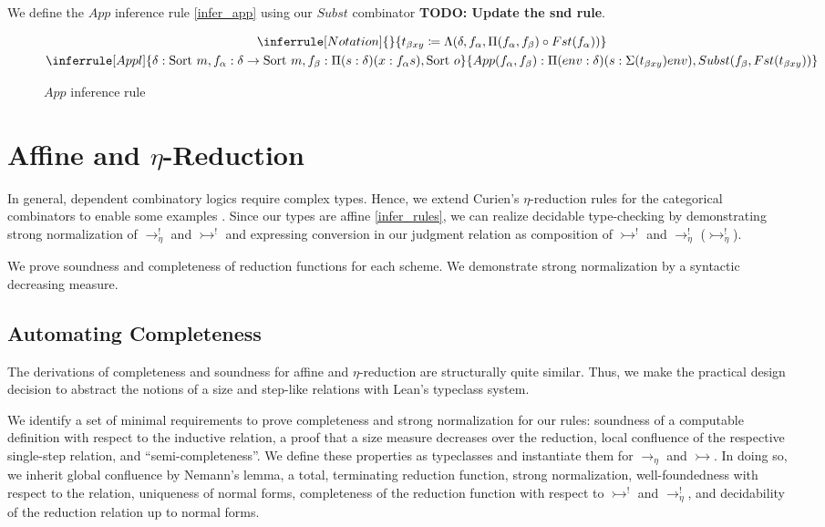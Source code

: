 \documentclass{article}
\newcommand{\sort}[1]{\text{Sort}\ #1}
\newcommand{\affarr}{\rightarrowtail}
\newcommand{\affetaarr}{\rightarrowtail_{\eta}}
\newcommand{\etaarr}{\rightarrow_{\eta}}
\begin{document}
We define the \(App\) inference rule \eqref{infer_app} using our \(Subst\) combinator \textbf{TODO: Update the snd rule}.

\begin{figure}[H]
  \centering
  \begin{equation}\label{infer_app}
    \begin{gathered}
    \inferrule [Notation]
    { }
    { t_{\beta x y} \coloneq \Lambda(\delta, f_\alpha, \Pi(f_\alpha, f_\beta) \circ Fst(f_\alpha)) }\\
    \inferrule [Appl]
    { \delta : \sort{m}, f_{\alpha} : \delta \rightarrow \sort{m}, f_{\beta} : \Pi(s : \delta) (x : f_\alpha s),\sort{o}}
    { App(f_\alpha, f_\beta) : \Pi(env : \delta) (s : \Sigma(t_{\beta x y}) env), Subst(f_\beta, Fst(t_{\beta x y}))}
    \end{gathered}
  \end{equation}
  \caption{\(App\) inference rule}
\end{figure}

\section{Affine and \(\eta\)-Reduction}

In general, dependent combinatory logics require complex types. Hence, we extend Curien's \(\eta\)-reduction rules for the categorical combinators to enable some examples \autocite[p. 221]{CURIEN1986188}. Since our types are affine \eqref{infer_rules}, we can realize decidable type-checking by demonstrating strong normalization of \(\etaarr^{!}\) and \(\affarr^{!}\) and expressing conversion in our judgment relation as composition of \(\affarr^{!}\) and \(\etaarr^{!}\) (\(\affetaarr^{!}\)).

We prove soundness and completeness of reduction functions for each scheme. We demonstrate strong normalization by a syntactic decreasing measure.

\subsection{Automating Completeness}\label{red_classes}

The derivations of completeness and soundness for affine and \(\eta\)-reduction are structurally quite similar. Thus, we make the practical design decision to abstract the notions of a size and step-like relations with Lean's typeclass system.

We identify a set of minimal requirements to prove completeness and strong normalization for our rules: soundness of a computable definition with respect to the inductive relation, a proof that a size measure decreases over the reduction, local confluence of the respective single-step relation, and ``semi-completeness''. We define these properties as typeclasses and instantiate them for \(\etaarr\) and \(\affarr\). In doing so, we inherit global confluence by Nemann's lemma, a total, terminating reduction function, strong normalization, well-foundedness with respect to the relation, uniqueness of normal forms, completeness of the reduction function with respect to \(\affarr^{!}\) and \(\etaarr^{!}\), and decidability of the reduction relation up to normal forms.
\end{document}
